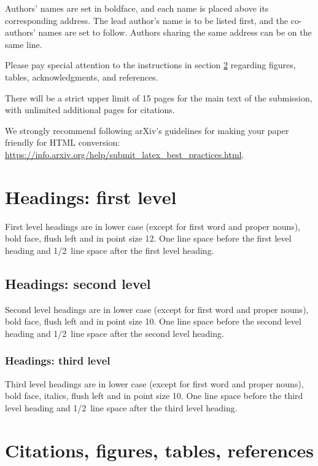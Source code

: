 \documentclass{article} %
\begin{document}
Authors' names are
set in boldface, and each name is placed above its corresponding
address. The lead author's name is to be listed first, and
the co-authors' names are set to follow. Authors sharing the
same address can be on the same line.

Please pay special attention to the instructions in section \ref{others}
regarding figures, tables, acknowledgments, and references.

There will be a strict upper limit of 15 pages for the main text of the
submission, with unlimited additional pages for citations.

We strongly recommend following arXiv's guidelines for making your paper
friendly for HTML conversion:
\url{https://info.arxiv.org/help/submit_latex_best_practices.html}.


\section{Headings: first level}
\label{headings}

First level headings are in lower case (except for first word and proper
nouns), bold face, flush left and in point size 12. One line space before the
first level heading and 1/2~line space after the first level heading.

\subsection{Headings: second level}

Second level headings are in lower case (except for first word and proper
nouns), bold face, flush left and in point size 10. One line space before the
second level heading and 1/2~line space after the second level heading.

\subsubsection{Headings: third level}

Third level headings are in lower case (except for first word and proper
nouns), bold face, italics, flush left and in point size 10. One line space
before the third level heading and 1/2~line space after the third level
heading.

\section{Citations, figures, tables, references}\label{others}
\end{document}
